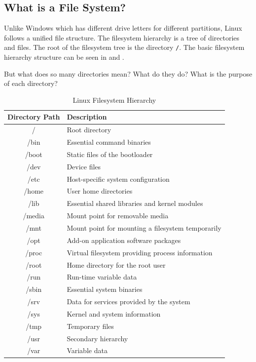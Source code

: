 \subsection{What is a File System?}

Unlike Windows which has different drive letters for different partitions, Linux follows a unified file structure. The filesystem hierarchy is a tree of directories and files. The root of the filesystem tree is the directory \texttt{/}. The basic filesystem hierarchy structure can be seen in  and .

But what does so many directories mean? What do they do? What is the purpose of each directory?

\begin{table}[h!]
\caption{Linux Filesystem Hierarchy}
\begin{tabular}{ c l }
  \toprule
 Directory Path & Description \\
 \midrule
  / & Root directory \\
  /bin & Essential command binaries \\
  /boot & Static files of the bootloader \\
  /dev & Device files \\
  /etc & Host-specific system configuration \\
  /home & User home directories \\
  /lib & Essential shared libraries and kernel modules \\
  /media & Mount point for removable media \\
  /mnt & Mount point for mounting a filesystem temporarily \\
  /opt & Add-on application software packages \\
  /proc & Virtual filesystem providing process information \\
  /root & Home directory for the root user \\
  /run & Run-time variable data \\
  /sbin & Essential system binaries \\
  /srv & Data for services provided by the system \\
  /sys & Kernel and system information \\
  /tmp & Temporary files \\
  /usr & Secondary hierarchy \\
  /var & Variable data \\
  \bottomrule
\end{tabular}
\end{table}

